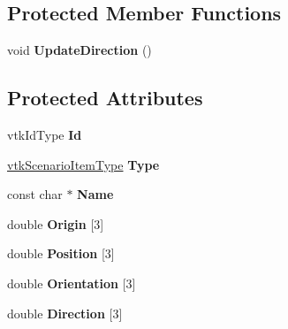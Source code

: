\subsection*{Protected Member Functions}
\begin{DoxyCompactItemize}
\item 
\hypertarget{classvtkScenarioItem_ae630f872b3b85fec80518b1ad9cee0ff}{
void {\bfseries UpdateDirection} ()}
\label{classvtkScenarioItem_ae630f872b3b85fec80518b1ad9cee0ff}

\end{DoxyCompactItemize}
\subsection*{Protected Attributes}
\begin{DoxyCompactItemize}
\item 
\hypertarget{classvtkScenarioItem_a30d34cd69bd0ba4f133312a830c78a3d}{
vtkIdType {\bfseries Id}}
\label{classvtkScenarioItem_a30d34cd69bd0ba4f133312a830c78a3d}

\item 
\hypertarget{classvtkScenarioItem_acbddd248c94ce369e17e978748a81a26}{
\hyperlink{classvtkScenarioItem_a77bcdf6979a30db08fa7934f218994e0}{vtkScenarioItemType} {\bfseries Type}}
\label{classvtkScenarioItem_acbddd248c94ce369e17e978748a81a26}

\item 
\hypertarget{classvtkScenarioItem_ac99d4959ab6fca2b24cc37fcf0301f6e}{
const char $\ast$ {\bfseries Name}}
\label{classvtkScenarioItem_ac99d4959ab6fca2b24cc37fcf0301f6e}

\item 
\hypertarget{classvtkScenarioItem_ade73a444d0e321d8fa58dcc983e7c2bd}{
double {\bfseries Origin} \mbox{[}3\mbox{]}}
\label{classvtkScenarioItem_ade73a444d0e321d8fa58dcc983e7c2bd}

\item 
\hypertarget{classvtkScenarioItem_ac340c5c2354a091f7cc61cf8a30c683d}{
double {\bfseries Position} \mbox{[}3\mbox{]}}
\label{classvtkScenarioItem_ac340c5c2354a091f7cc61cf8a30c683d}

\item 
\hypertarget{classvtkScenarioItem_adf8fdd601f8909cd71204faab5d05ca3}{
double {\bfseries Orientation} \mbox{[}3\mbox{]}}
\label{classvtkScenarioItem_adf8fdd601f8909cd71204faab5d05ca3}

\item 
\hypertarget{classvtkScenarioItem_adf8878f2674890cfe83d68ef49d36831}{
double {\bfseries Direction} \mbox{[}3\mbox{]}}
\label{classvtkScenarioItem_adf8878f2674890cfe83d68ef49d36831}


\end{DoxyCompactItemize}
